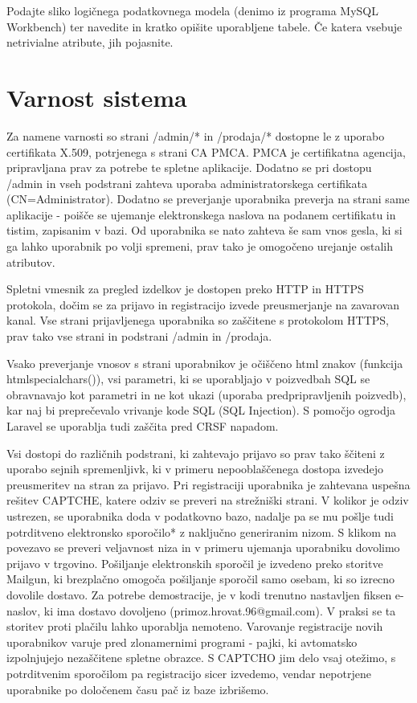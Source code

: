 \documentclass[a4paper,12pt]{report}
\begin{document}
Podajte sliko logičnega podatkovnega modela (denimo iz programa MySQL Workbench) ter navedite in kratko opišite uporabljene tabele. Če katera vsebuje netrivialne atribute, jih pojasnite.

\chapter{Varnost sistema}

Za namene varnosti so strani /admin/* in /prodaja/* dostopne le z uporabo certifikata X.509, potrjenega s strani CA PMCA. PMCA je certifikatna agencija, pripravljana prav za potrebe te spletne aplikacije. Dodatno se pri dostopu /admin in vseh podstrani zahteva uporaba administratorskega certifikata (CN=Administrator). Dodatno se preverjanje uporabnika preverja na strani same aplikacije - poišče se ujemanje elektronskega naslova na podanem certifikatu in tistim, zapisanim v bazi. Od uporabnika se nato zahteva še sam vnos gesla, ki si ga lahko uporabnik po volji spremeni, prav tako je omogočeno urejanje ostalih atributov.

Spletni vmesnik za pregled izdelkov je dostopen preko HTTP in HTTPS protokola, dočim se za prijavo in registracijo izvede preusmerjanje na zavarovan kanal. Vse strani prijavljenega uporabnika so zaščitene s protokolom HTTPS, prav tako vse strani in podstrani /admin in /prodaja.

Vsako preverjanje vnosov s strani uporabnikov je očiščeno html znakov (funkcija htmlspecialchars()), vsi parametri, ki se uporabljajo v poizvedbah SQL se obravnavajo kot parametri in ne kot ukazi (uporaba predpripravljenih poizvedb), kar naj bi preprečevalo vrivanje kode SQL (SQL Injection). S pomočjo ogrodja Laravel se uporablja tudi zaščita pred CRSF napadom.

Vsi dostopi do različnih podstrani, ki zahtevajo prijavo so prav tako ščiteni z uporabo sejnih spremenljivk, ki v primeru nepooblaščenega dostopa izvedejo preusmeritev na stran za prijavo. Pri registraciji uporabnika je zahtevana uspešna rešitev CAPTCHE, katere odziv se preveri na strežniški strani. V kolikor je odziv ustrezen, se uporabnika doda v podatkovno bazo, nadalje pa se mu pošlje tudi potrditveno elektronsko sporočilo* z naključno generiranim nizom. S klikom na povezavo se preveri veljavnost niza in v primeru ujemanja uporabniku dovolimo prijavo v trgovino. Pošiljanje elektronskih sporočil je izvedeno preko storitve Mailgun, ki brezplačno omogoča pošiljanje sporočil samo osebam, ki so izrecno dovolile dostavo. Za potrebe demostracije, je v kodi trenutno nastavljen fiksen e-naslov, ki ima dostavo dovoljeno (primoz.hrovat.96@gmail.com). V praksi se ta storitev proti plačilu lahko uporablja nemoteno. Varovanje registracije novih uporabnikov varuje pred zlonamernimi programi - pajki, ki avtomatsko izpolnjujejo nezaščitene spletne obrazce. S CAPTCHO jim delo vsaj otežimo, s potrditvenim sporočilom pa registracijo sicer izvedemo, vendar nepotrjene uporabnike po določenem času pač iz baze izbrišemo.
\end{document}
